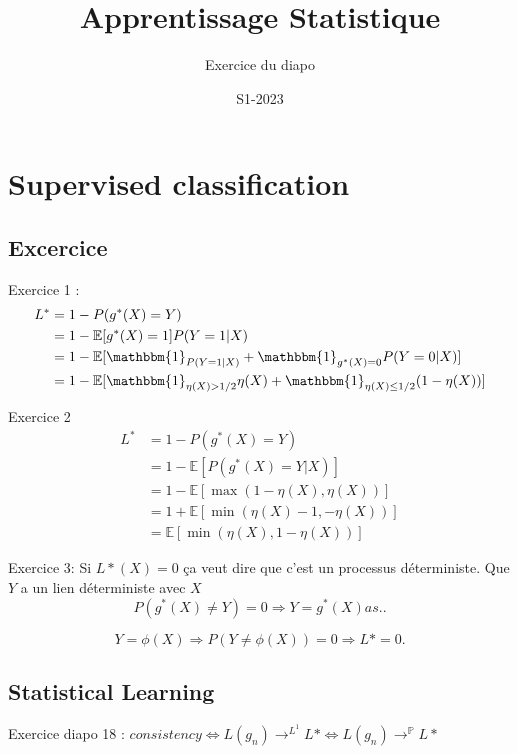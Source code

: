 \documentclass{article}
\title{Apprentissage Statistique}
\author{Exercice du diapo}
\date{S1-2023}
\theoremstyle{plain}%
\theoremstyle{definition}
\theoremstyle{remark}
\begin{document}
\maketitle

\section{Supervised classification}
\subsection{Excercice}
Exercice 1 : 
\begin{align*}
    L^* &= 1 - P(g^*(X) = Y) \\
        &= 1 - \mathbb{E} [ g^*(X) = 1] P( Y = 1 | X) \\
        &= 1 - \mathbb{E} [ \mathbbm{1}_{P(Y=1 | X)} + \mathbbm{1}_{g^*(X) = 0} P(Y=0 | X)] \\
        &= 1 - \mathbb{E} [ \mathbbm{1}_{\eta (X) > 1/2} \eta (X) + \mathbbm{1}_{\eta (X) \leq  1/2} (1 - \eta (X))]
\end{align*}
    
Exercice 2
\begin{align*}
    L^ * &= 1 - P(g^*(X) = Y) \\
        &= 1 - \mathbb{E} [P(g^*(X) = Y | X)] \\
        &= 1 - \mathbb{E} [ \max ( 1 - \eta (X) , \eta (X))] \\
        &= 1 + \mathbb{E} [ \min (\eta (X) - 1 , - \eta (X))] \\
        &= \mathbb{E} [ \min  (\eta (X) , 1 - \eta (X))]
\end{align*}

Exercice 3:
Si $ L*(X) = 0 $ ça veut dire que c'est un processus déterministe. Que $ Y $  a un lien déterministe avec $ X $ 
\[
    P(g^*(X) \neq  Y) = 0 \Rightarrow  Y = g^*(X) as. 
.\]

\[
    Y = \phi (X) \Rightarrow P(Y \neq \phi (X) ) = 0 \Rightarrow L* = 0
.\]

\subsection{Statistical Learning}
Exercice diapo 18 : $ consistency \Leftrightarrow L(g_n) \to ^{L^1} L* \Leftrightarrow L(g_n) \to ^{ \mathbb{P}} L* $ 
\end{document}
